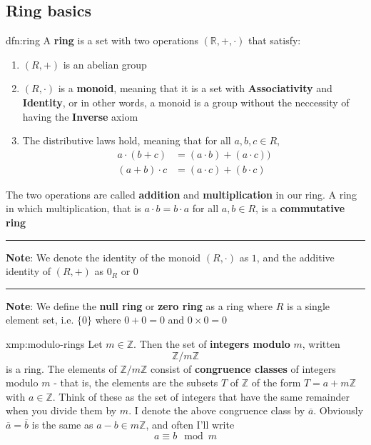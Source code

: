 \documentclass[landscape, 8pt]{extarticle}
\begin{document}
\begin{multicols}{3}
\subsection{Ring basics}
\begin{dfn}{dfn:ring}{}
    A \textbf{ring} is a set with two operations $(\mathbb{R}, +, \cdot)$ that satisfy:

    \begin{enumerate}
        \setlength\itemsep{0em}
        \item $(R, +)$ is an abelian group
        \item $(R, \cdot)$ is a \textbf{monoid}, meaning that it is a set with \textbf{Associativity} and \textbf{Identity}, or in other words, a monoid is a group without the neccessity of having the \textbf{Inverse} axiom
        \item The distributive laws hold, meaning that for all $a,b,c\in R$,
            \begin{align*}
                a \cdot (b + c) &= (a \cdot b) + (a \cdot c)) \\
                (a + b) \cdot c &= (a \cdot c) + (b \cdot c)
            \end{align*}
    \end{enumerate}
    The two operations are called \textbf{addition} and \textbf{multiplication} in our ring. A ring in which multiplication, that is $a \cdot b = b \cdot a$ for all $a,b\in R$, is a \textbf{commutative ring}

    \noindent\rule{\textwidth}{0.2pt}

    \textbf{Note}: We denote the identity of the monoid $(R, \cdot)$ as $1$, and the additive identity of $(R, +)$ as $0_{R}$ or $0$

    \noindent\rule{\textwidth}{0.2pt}
    \textbf{Note}: We define the \textbf{null ring} or \textbf{zero ring} as a ring where $R$ is a single element set, i.e. $\{0\}$ where $0 + 0 = 0$ and $0 \times 0 = 0$
\end{dfn}


\begin{xmp}{xmp:modulo-rings}{}
    Let $m\in \mathbb{Z}$. Then the set of \textbf{integers modulo} $m$, written
    \[\mathbb{Z} / m\mathbb{Z}\]
    is a ring. The elements of $\mathbb{Z} / m\mathbb{Z}$ consist of \textbf{congruence classes} of integers modulo $m$ - that is, the elements are the subsets $T$ of $\mathbb{Z}$ of the form $T = a + m\mathbb{Z}$ with $a\in \mathbb{Z}$. Think of these as the set of integers that have the same remainder when you divide them by $m$. I denote the above congruence class by $\overline{a}$. Obviously $\overline{a} = \overline{b}$ is the same as $a-b\in m\mathbb{Z}$, and often I'll write
    \[a \equiv b \mod m\]
\end{xmp}


\end{multicols}
\end{document}
